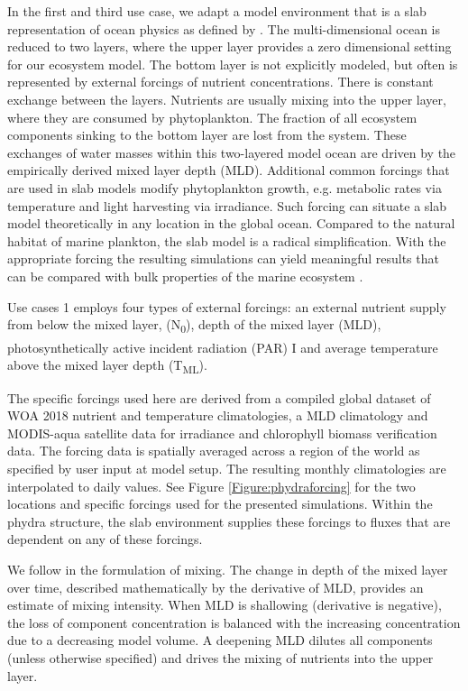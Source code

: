 \documentclass[journal abbreviations, manuscript]{copernicus}
\begin{document}
In the first and third use case, we adapt a model environment that is a slab representation of ocean physics as defined by \citet{Evans1985ACycles}. The multi-dimensional ocean is reduced to two layers, where the upper layer provides a zero dimensional setting for our ecosystem model. The bottom layer is not explicitly modeled, but often is represented by external forcings of nutrient concentrations. There is constant exchange between the layers. Nutrients are usually mixing into the upper layer, where they are consumed by phytoplankton. The fraction of all ecosystem components sinking to the bottom layer are lost from the system. These exchanges of water masses within this two-layered model ocean are driven by the empirically derived mixed layer depth (MLD). Additional common forcings that are used in slab models modify phytoplankton growth, e.g. metabolic rates via temperature and light harvesting via irradiance. Such forcing can situate a slab model theoretically in any location in the global ocean. Compared to the natural habitat of marine plankton, the slab model is a radical simplification. With the appropriate forcing the resulting simulations can yield meaningful results that can be compared with bulk properties of the marine ecosystem \cite[e.g.][]{Evans1985ACycles, Fasham1990a}.

Use cases 1 employs four types of external forcings: an external nutrient supply from below the mixed layer, (\unit{N_0}), depth of the mixed layer (MLD), photosynthetically active incident radiation (PAR) \unit{I^\emptyset} and average temperature above the mixed layer depth (\unit{T_{ML}}).

The specific forcings used here are derived from a compiled global dataset of WOA 2018 nutrient and temperature climatologies, a MLD climatology and MODIS-aqua satellite data for irradiance and chlorophyll biomass verification data. The forcing data is spatially averaged across a region of the world as specified by user input at model setup. The resulting monthly climatologies are interpolated to daily values. See Figure \ref{Figure:phydraforcing} for the two locations and specific forcings used for the presented simulations. Within the phydra structure, the slab environment supplies these forcings to fluxes that are dependent on any of these forcings. 

We follow \citet{Evans1985ACycles} in the formulation of mixing. The change in depth of the mixed layer over time, described mathematically by the derivative of MLD, provides an estimate of mixing intensity. When MLD is shallowing (derivative is negative), the loss of component concentration is balanced with the increasing concentration due to a decreasing model volume. A deepening MLD dilutes all components (unless otherwise specified) and drives the mixing of nutrients into the upper layer.
\end{document}
